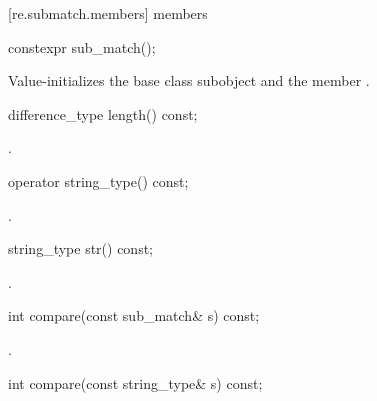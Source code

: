 [re.submatch.members]{ members}

%
\begin{itemdecl}
constexpr sub_match();
\end{itemdecl}

\begin{itemdescr}
\pnum
\effects Value-initializes the  base class subobject and the member
.
\end{itemdescr}

%
\begin{itemdecl}
difference_type length() const;
\end{itemdecl}

\begin{itemdescr}
\pnum\returns {}.
\end{itemdescr}

%
\begin{itemdecl}
operator string_type() const;
\end{itemdecl}

\begin{itemdescr}
\pnum\returns {}.
\end{itemdescr}

%
\begin{itemdecl}
string_type str() const;
\end{itemdecl}

\begin{itemdescr}
\pnum\returns {}.
\end{itemdescr}

%
\begin{itemdecl}
int compare(const sub_match& s) const;
\end{itemdecl}

\begin{itemdescr}
\pnum\returns {}.
\end{itemdescr}

%
\begin{itemdecl}
int compare(const string_type& s) const;
\end{itemdecl}


